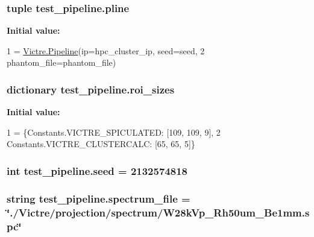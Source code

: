 \hypertarget{namespacetest__pipeline_a4f34ebd50c5400c94a3b33124629e2fe}{
\subsubsection[{pline}]{\setlength{\rightskip}{0pt plus 5cm}tuple test\-\_\-pipeline.\-pline}}\label{namespacetest__pipeline_a4f34ebd50c5400c94a3b33124629e2fe}
{\bfseries Initial value\-:}
\begin{DoxyCode}
1 = \hyperlink{namespaceVictre_1_1Pipeline}{Victre.Pipeline}(ip=hpc\_cluster\_ip, seed=seed,
2                         phantom\_file=phantom\_file)
\end{DoxyCode}
\hypertarget{namespacetest__pipeline_ac3f90bba6b3ba7eb9c6c5fbf56f3f540}{
\subsubsection[{roi\-\_\-sizes}]{\setlength{\rightskip}{0pt plus 5cm}dictionary test\-\_\-pipeline.\-roi\-\_\-sizes}}\label{namespacetest__pipeline_ac3f90bba6b3ba7eb9c6c5fbf56f3f540}
{\bfseries Initial value\-:}
\begin{DoxyCode}
1 = \{Constants.VICTRE\_SPICULATED: [109, 109, 9],
2              Constants.VICTRE\_CLUSTERCALC: [65, 65, 5]\}
\end{DoxyCode}
\hypertarget{namespacetest__pipeline_a2cc55609849787d81000c76439d285af}{
\subsubsection[{seed}]{\setlength{\rightskip}{0pt plus 5cm}int test\-\_\-pipeline.\-seed = 2132574818}}\label{namespacetest__pipeline_a2cc55609849787d81000c76439d285af}
\hypertarget{namespacetest__pipeline_a04ba5a1d7ea995de9393c50eb14ef9ad}{
\subsubsection[{spectrum\-\_\-file}]{\setlength{\rightskip}{0pt plus 5cm}string test\-\_\-pipeline.\-spectrum\-\_\-file = \char`\"{}./Victre/projection/spectrum/W28k\-Vp\-\_\-\-Rh50um\-\_\-\-Be1mm.\-spc\char`\"{}}}\label{namespacetest__pipeline_a04ba5a1d7ea995de9393c50eb14ef9ad}
